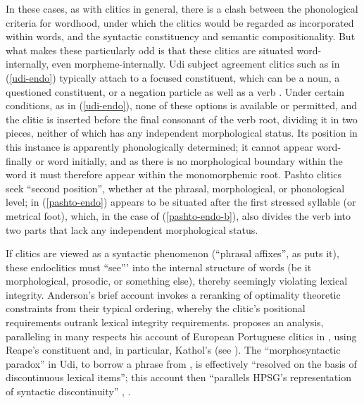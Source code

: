 \documentclass[output=paper]{langsci/langscibook}
\begin{document}
In these cases, as with clitics in general, there is a clash between the phonological criteria for wordhood, under which the clitics would be regarded as incorporated within words, and the syntactic constituency and semantic compositionality.
But what makes these particularly odd is that these clitics are situated word-internally, even morpheme-internally. 
Udi subject agreement clitics such as  in (\ref{udi-endo}) typically attach to a focused constituent, which can be a noun, a questioned constituent, or a negation particle as well as a verb \citep{Harris2000}.
Under certain conditions, as in (\ref{udi-endo}), none of these options is available or permitted, and the clitic is inserted before the final consonant of the verb root, dividing it in two pieces, neither of which has any independent morphological status.
Its position in this instance is apparently phonologically determined; it cannot appear word-finally or word initially, and as there is no morphological boundary within the word it must therefore appear within the monomorphemic root.
Pashto clitics  seek ``second position'', whether at the phrasal, morphological, or phonological level;  in (\ref{pashto-endo}) appears to be situated after the first stressed syllable (or metrical foot), which, in the case of (\ref{pashto-endo-b}), also divides the verb into two parts that lack any independent morphological status.

If clitics are viewed as a syntactic phenomenon (``phrasal affixes'', as \citet{Anderson2005} puts it), these endoclitics must ``see''' into the internal structure of words (be it morphological, prosodic, or something else), thereby seemingly violating  lexical integrity. Anderson's brief account invokes a reranking of optimality theoretic constraints from their typical ordering, whereby the clitic's positional requirements outrank lexical integrity requirements. \citet{Crysmann2000b} proposes an analysis, paralleling in many respects his account of European Portuguese clitics in \citet{Crysmann2000a-lex}, using Reape's constituent  \citep{Reape1994} and, in particular, Kathol's  \citep{Kathol1999} (see ). The ``morphosyntactic paradox'' in Udi, to borrow a phrase from \citet{Crysmann2002}, is effectively ``resolved on the basis of discontinuous lexical items''; this account then ``parallels HPSG's representation of syntactic discontinuity'' \citep{Crysmann2000b}, .
\end{document}
